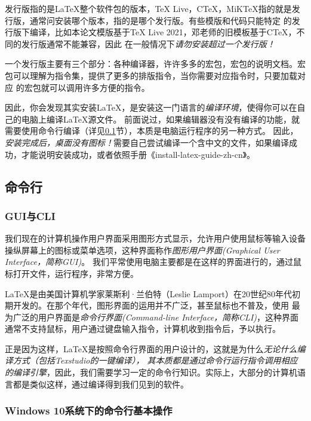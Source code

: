 发行版指的是\LaTeX{}整个软件包的版本，\TeX{} Live，C\TeX{}，MiK\TeX{}指的就是发行版，通常问安装哪个版本，指的是哪个发行版。有些模版和代码只能特定
的发行版下编译，比如本论文模版基于\TeX{} Live 2021，邓老师的旧模板基于C\TeX{}，不同的发行版通常不能兼容，因此
在一般情况下\emph{请勿安装超过一个发行版！}

一个发行版主要有三个部分：各种编译器，许许多多的宏包，宏包的说明文档。宏包可以理解为指令集，提供了更多的排版指令，当你需要对应指令时，只要加载对应
的宏包就可以调用许多方便的指令。

因此，你会发现其实安装\LaTeX{}，是安装这一门语言的\emph{编译环境}，使得你可以在自己的电脑上编译\LaTeX{}源文件。
前面说过，如果编辑器没有没有编译的功能，就需要使用命令行编译（详见\ref{subsec:mlh}节），本质是电脑运行程序的另一种方式。
因此，\emph{安装完成后，桌面没有图标！}需要自己尝试编译一个含中文的文件，如果编译成功，才能说明安装成功，或者依照手册《install-latex-guide-zh-cn》。




\subsection{命令行}\label{subsec:mlh}


\subsubsection{GUI与CLI}


我们现在的计算机操作用户界面采用图形方式显示，允许用户使用鼠标等输入设备操纵屏幕上的图标或菜单选项，这种界面称作\emph{图形用户界面(Graphical User Interface，简称GUI)}。
我们平常使用电脑主要都是在这样的界面进行的，通过鼠标打开文件，运行程序，非常方便。

\LaTeX{}是由美国计算机学家莱斯利·兰伯特（Leslie Lamport）在20世纪80年代初期开发的。在那个年代，图形界面的运用并不广泛，甚至鼠标也不普及，使用
最为广泛的用户界面是\emph{命令行界面(Command-line Interface，简称CLI)}，这种界面通常不支持鼠标，用户通过键盘输入指令，计算机收到指令后，予以执行。

正是因为这样，\LaTeX{}是按照命令行界面的用户设计的，这就是为什么\emph{无论什么编译方式（包括Texstudio的一键编译），
其本质都是通过命令行运行指令调用相应的编译引擎}，因此，我们需要学习一定的命令行知识。实际上，大部分的计算机语言都是类似这样，通过编译得到我们见到的软件。




\subsubsection{Windows 10系统下的命令行基本操作}\label{subsub:cz}


